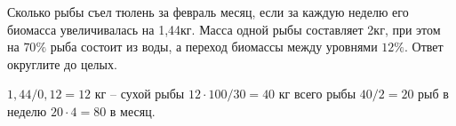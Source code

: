 
Сколько рыбы съел тюлень за февраль месяц, если за каждую неделю его
биомасса увеличивалась на 1,44кг.  Масса
одной рыбы составляет 2кг, при этом на $70\%$ рыба состоит из воды, а переход
биомассы между уровнями $12\%$. Ответ округлите до целых.

\solutionSection

$1,44/0,12=12$ кг – сухой рыбы $12 \cdot 100/30=40$ кг всего рыбы $40/2=20$ рыб в неделю $20 \cdot 4 = 80$ в месяц.

